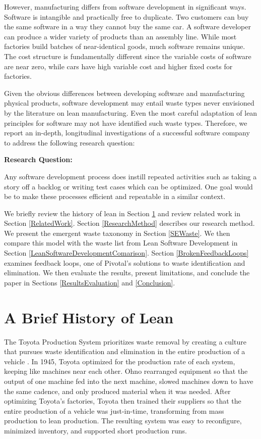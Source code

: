 However, manufacturing differs from software development in significant ways. Software is intangible and practically free to duplicate. Two customers can buy the same software in a way they cannot buy the same car. A software developer can produce a wider variety of products than an assembly line. While most factories build batches of near-identical goods, much software remains unique. The cost structure is fundamentally different since the variable costs of software are near zero, while cars have high variable cost and higher fixed costs for factories. 

Given the obvious differences between developing software and manufacturing physical products, software development may entail waste types never envisioned by the literature on lean manufacturing. Even the most careful adaptation of lean principles for software may not have identified such waste types. Therefore, we report an in-depth, longitudinal investigations of a successful software company to address the following research question: 

\textbf{Research Question: }

Any software development process does instill repeated activities such as taking a story off a backlog or writing test cases which can be optimized. One goal would be to make these processes efficient and repeatable in a similar context. 

We briefly review the history of lean in Section \ref{HistoryOfLean} and review related work in Section \ref{RelatedWork}. Section \ref{ResearchMethod} describes our research method. We present the emergent waste taxonomy in Section \ref{SEWaste}. We then compare this model with the waste list from Lean Software Development in Section \ref{LeanSoftwareDevelopmentComarison}. Section \ref{BrokenFeedbackLoops} examines feedback loops, one of Pivotal's solutions to waste identification and elimination. We then evaluate the results, present limitations, and conclude the paper in Sections \ref{ResultsEvaluation} and \ref{Conclusion}.

\section{A Brief History of Lean}
\label{HistoryOfLean}

The Toyota Production System prioritizes waste removal by creating a culture that pursues waste identification and elimination in the entire production of a vehicle \cite{OhnoToyotaProductionSystem, ShingoToyotaProductionSystem}. In 1945, Toyota optimized for the production rate of each system, keeping like machines near each other. Ohno rearranged equipment so that the output of one machine fed into the next machine, slowed machines down to have the same cadence, and only produced material when it was needed. After optimizing Toyota's factories, Toyota then trained their suppliers so that the entire production of a vehicle was just-in-time, transforming from mass production to lean production. The resulting  system was easy to reconfigure, minimized inventory, and supported short production runs.  

